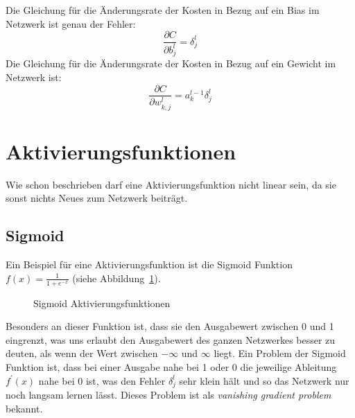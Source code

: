 \documentclass[12pt,a4paper]{report}
\begin{document}
Die Gleichung für die Änderungsrate der Kosten in Bezug auf ein Bias im Netzwerk ist genau der Fehler:
\[\frac{\partial C}{\partial b^l_j} = \delta^l_j\]
Die Gleichung für die Änderungsrate der Kosten in Bezug auf ein Gewicht im Netzwerk ist:
\[\frac{\partial C}{\partial w^{l}_{k,j}} = a^{l-1}_k\delta^l_j\]

\section{Aktivierungsfunktionen}\label{sec:aktivierungsfunktionen}
Wie schon beschrieben darf eine Aktivierungsfunktion nicht linear sein, da sie sonst nichts Neues zum Netzwerk beiträgt.
\subsection{Sigmoid}
Ein Beispiel für eine Aktivierungsfunktion ist die Sigmoid Funktion $f(x) = \frac{1}{1 + e^{-x}}$ (siehe Abbildung~\ref{fig:activation1}).
\begin{figure}[h]
    \centering
{}
    \caption{Sigmoid Aktivierungsfunktionen}
    \label{fig:activation1}
\end{figure}
Besonders an dieser Funktion ist, dass sie den Ausgabewert zwischen 0 und 1 eingrenzt, was uns erlaubt den Ausgabewert des ganzen
Netzwerkes besser zu deuten, als wenn der Wert zwischen $-\infty$ und $\infty$ liegt.
Ein Problem der Sigmoid Funktion ist, dass bei einer Ausgabe nahe bei 1 oder 0 die jeweilige Ableitung $f^\prime(x)$ nahe bei 0 ist,
was den Fehler $\delta^l_j$ sehr klein hält und so das Netzwerk nur noch langsam lernen lässt.
Dieses Problem ist als \textit{vanishing gradient problem} bekannt.
\end{document}
